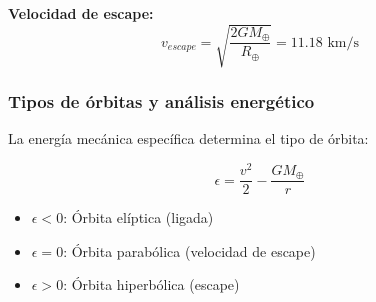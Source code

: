 \documentclass{article}
\begin{document}
	\textbf{Velocidad de escape:}
	\begin{equation}
		v_{escape} = \sqrt{\frac{2GM_{\oplus}}{R_{\oplus}}} = 11.18 \text{ km/s}
	\end{equation}
	
	\subsubsection{Tipos de órbitas y análisis energético}
	
	La energía mecánica específica determina el tipo de órbita:
	
	\begin{equation}
		\epsilon = \frac{v^2}{2} - \frac{GM_{\oplus}}{r}
	\end{equation}
	
	\begin{itemize}
		\item $\epsilon < 0$: Órbita elíptica (ligada)
		\item $\epsilon = 0$: Órbita parabólica (velocidad de escape)
		\item $\epsilon > 0$: Órbita hiperbólica (escape)
	\end{itemize}
	
\end{document}

